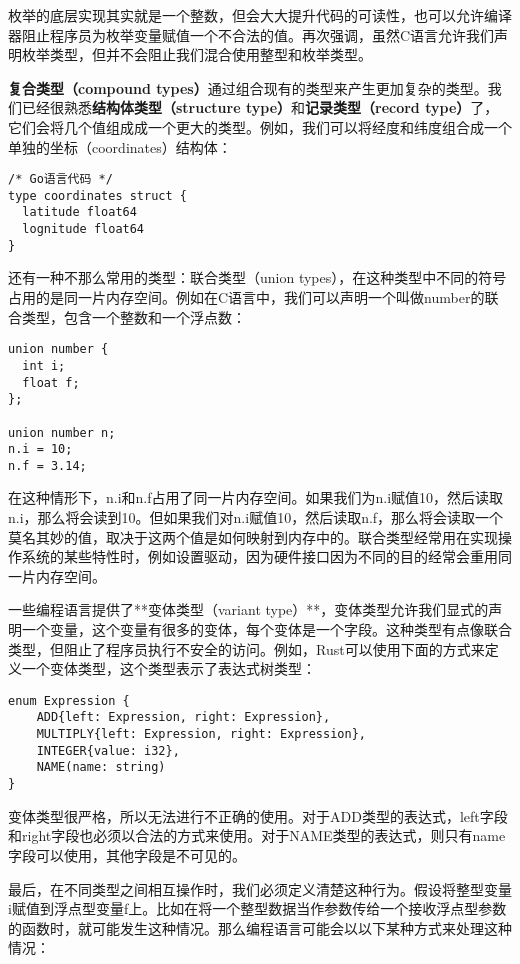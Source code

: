 \documentclass[cn,11pt,chinese]{elegantbook}
\begin{document}
枚举的底层实现其实就是一个整数，但会大大提升代码的可读性，也可以允许编译器阻止程序员为枚举变量赋值一个不合法的值。再次强调，虽然C语言允许我们声明枚举类型，但并不会阻止我们混合使用整型和枚举类型。

\textbf{复合类型（compound types）}通过组合现有的类型来产生更加复杂的类型。我们已经很熟悉\textbf{结构体类型（structure type）}和\textbf{记录类型（record type）}了，它们会将几个值组成成一个更大的类型。例如，我们可以将经度和纬度组合成一个单独的坐标（coordinates）结构体：

\begin{verbatim}
/* Go语言代码 */
type coordinates struct {
  latitude float64
  lognitude float64
}
\end{verbatim}

还有一种不那么常用的类型：联合类型（union types），在这种类型中不同的符号占用的是同一片内存空间。例如在C语言中，我们可以声明一个叫做number的联合类型，包含一个整数和一个浮点数：

\begin{verbatim}
union number {
  int i;
  float f;
};

union number n;
n.i = 10;
n.f = 3.14;
\end{verbatim}

在这种情形下，n.i和n.f占用了同一片内存空间。如果我们为n.i赋值10，然后读取n.i，那么将会读到10。但如果我们对n.i赋值10，然后读取n.f，那么将会读取一个莫名其妙的值，取决于这两个值是如何映射到内存中的。联合类型经常用在实现操作系统的某些特性时，例如设置驱动，因为硬件接口因为不同的目的经常会重用同一片内存空间。

一些编程语言提供了**变体类型（variant type）**，变体类型允许我们显式的声明一个变量，这个变量有很多的变体，每个变体是一个字段。这种类型有点像联合类型，但阻止了程序员执行不安全的访问。例如，Rust可以使用下面的方式来定义一个变体类型，这个类型表示了表达式树类型：

\begin{verbatim}
enum Expression {
    ADD{left: Expression, right: Expression},
    MULTIPLY{left: Expression, right: Expression},
    INTEGER{value: i32},
    NAME(name: string)
}
\end{verbatim}

变体类型很严格，所以无法进行不正确的使用。对于ADD类型的表达式，left字段和right字段也必须以合法的方式来使用。对于NAME类型的表达式，则只有name字段可以使用，其他字段是不可见的。

最后，在不同类型之间相互操作时，我们必须定义清楚这种行为。假设将整型变量i赋值到浮点型变量f上。比如在将一个整型数据当作参数传给一个接收浮点型参数的函数时，就可能发生这种情况。那么编程语言可能会以以下某种方式来处理这种情况：
\end{document}
